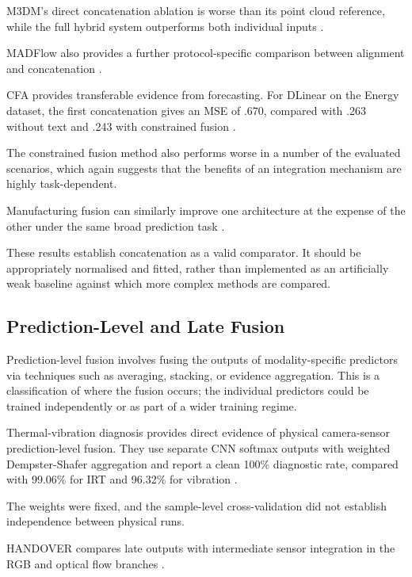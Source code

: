 M3DM's direct concatenation ablation is worse than its point cloud reference, while the full hybrid
system outperforms both individual inputs \citep[Table~4]{Wang2023Multimodal}.

MADFlow also provides a further protocol-specific comparison between alignment and concatenation
\citep{Li2025MADFlow}.

CFA provides transferable evidence from forecasting. For DLinear on the Energy dataset, the first
concatenation gives an MSE of .670, compared with .263 without text and .243 with constrained fusion
\citep[PDF p.~4, Table~4]{P023}.

The constrained fusion method also performs worse in a number of the evaluated scenarios, which
again suggests that the benefits of an integration mechanism are highly task-dependent.

Manufacturing fusion can similarly improve one architecture at the expense of the other under the
same broad prediction task \citep[Table~3]{Li2022A}.

These results establish concatenation as a valid comparator. It should be appropriately normalised
and fitted, rather than implemented as an artificially weak baseline against which more complex
methods are compared.

\subsection{Prediction-Level and Late Fusion}

Prediction-level fusion involves fusing the outputs of modality-specific predictors via techniques
such as averaging, stacking, or evidence aggregation. This is a classification of where the fusion
occurs; the individual predictors could be trained independently or as part of a wider training
regime.

Thermal-vibration diagnosis provides direct evidence of physical camera-sensor prediction-level
fusion. They use separate CNN softmax outputs with weighted Dempster-Shafer aggregation and report a
clean 100\% diagnostic rate, compared with 99.06\% for IRT and 96.32\% for vibration \citep[PDF
p.~7, Table~VII]{Huo2022Multisensor}.

The weights were fixed, and the sample-level cross-validation did not establish independence between
physical runs.

HANDOVER compares late outputs with intermediate sensor integration in the RGB and optical flow
branches \citep[PDF pp.~5--7]{Thoduka2024Handover}.


